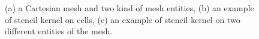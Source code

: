 \begin{figure}
\captionsetup[subfloat]{farskip=2pt}
\begin{center}
\hfill
{}
\hfill
{}
\end{center}
\caption{(a) a Cartesian mesh and two kind of mesh entities, (b) an example of stencil kernel on cells, (c) an example of stencil kernel on two different entities of the mesh.}
\label{fig:gspmsp}
\end{figure}


